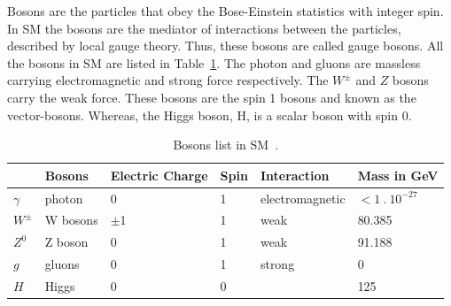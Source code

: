 Bosons are the particles that obey the Bose-Einstein statistics with integer spin. In SM the bosons are the mediator of interactions between the particles, described by local gauge theory. Thus, these bosons are called gauge bosons. All the bosons in SM are listed in Table~\ref{table:smbosons}. The photon and gluons are massless carrying electromagnetic and strong force respectively. The $W^{\pm}$ and $Z$ bosons carry the weak force. These bosons are the spin 1 bosons and known as the vector-bosons. Whereas, the Higgs boson, H, is a scalar boson with spin 0.

\begin{table}
\centering
\begin{tabular}[!htbp]{l l l l l l}
\hline
    & \textbf{Bosons} & \textbf{Electric Charge} & \textbf{Spin} & \textbf{Interaction} & \textbf{Mass in GeV} \\
\hline
$\gamma$  & photon   & 0      & 1 & electromagnetic   &   $<1~.~10^{-27}$ \\
$W^{\pm}$ & W bosons & $\pm$1 & 1 & weak              &  80.385     \\
$Z^0$     & Z boson  & 0      & 1 & weak              &  91.188     \\
$g$       & gluons   & 0      & 1 & strong            &  0          \\
\hline
$H$       & Higgs    & 0      & 0 &                    & 125        \\
\hline
\end{tabular}
\caption{Bosons list in SM~\cite{Bittrich2012}.}
\label{table:smbosons}
\end{table}

